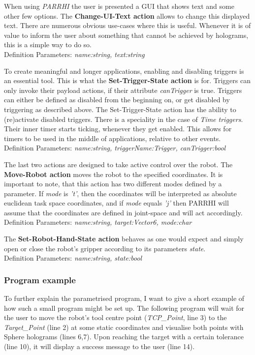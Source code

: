 When using \textit{PARRHI} the user is presented a GUI that shows text and some other few options. The \textbf{Change-UI-Text action} allows to change this displayed text. There are numerous obvious use-cases where this is useful. Whenever it is of value to inform the user about something that cannot be achieved by holograms, this is a simple way to do so.\\Definition Parameters: \textit{name:string, text:string}

To create meaningful and longer applications, enabling and disabling triggers is an essential tool. This is what the \textbf{Set-Trigger-State action} is for. Triggers can only invoke their payload actions, if their attribute \textit{canTrigger} is true. Triggers can either be defined as disabled from the beginning on, or get disabled by triggering as described above. The Set-Trigger-State action has the ability to (re)activate disabled triggers. There is a speciality in the case of \textit{Time triggers}. Their inner timer starts ticking, whenever they get enabled. This allows for timers to be used in the middle of applications, relative to other events.\\Definition Parameters: \textit{name:string, triggerName:Trigger, canTrigger:bool}

The last two actions are designed to take active control over the robot. The \textbf{Move-Robot action} moves the robot to the specified coordinates. It is important to note, that this action has two different modes defined by a  parameter. If \textit{mode} is \textit{'t'}, then the coordinates will be interpreted as absolute euclidean task space coordinates, and if \textit{mode} equals \textit{'j'} then PARRHI will assume that the coordinates are defined in joint-space and will act accordingly.\\Definition Parameters: \textit{name:string, target:Vector6, mode:char}

The \textbf{Set-Robot-Hand-State action} behaves as one would expect and simply open or close the robot's gripper according to its parameters \textit{state}.\\Definition Parameters: \textit{name:string, state:bool}

\subsubsection{Program example}
To further explain the parametrised program, I want to give a short example of how such a small program might be set up. The following program will wait for the user to move the robot's tool centre point (\textit{TCP\_Point}, line 3) to the \textit{Target\_Point} (line 2) at some static coordinates and visualise both points with Sphere holograms (lines 6,7). Upon reaching the target with a certain tolerance (line 10), it will display a success message to the user (line 14).

